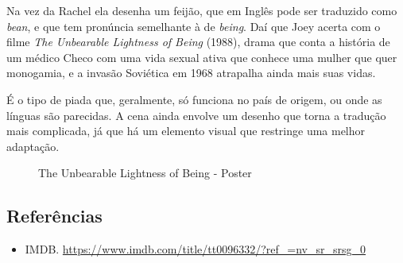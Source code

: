 Na vez da Rachel ela desenha um feijão, que em Inglês pode ser traduzido
como \emph{bean}, e que tem pronúncia semelhante à de \emph{being}. Daí
que Joey acerta com o filme \emph{The Unbearable Lightness of Being}
(1988), drama que conta a história de um médico Checo com uma vida
sexual ativa que conhece uma mulher que quer monogamia, e a invasão
Soviética em 1968 atrapalha ainda mais suas vidas.

É o tipo de piada que, geralmente, só funciona no país de origem, ou
onde as línguas são parecidas. A cena ainda envolve um desenho que torna
a tradução mais complicada, já que há um elemento visual que restringe
uma melhor adaptação.

\begin{figure}
  \centering
    \caption{The Unbearable Lightness of Being - Poster\label{fig:the-unbearable-lightness-of-being-poster}}
\end{figure}

\hypertarget{referuxeancias-16}{%
\subsection{Referências}\label{referuxeancias-16}}

\begin{itemize}
\tightlist
\item
  \sloppy IMDB. \url{https://www.imdb.com/title/tt0096332/?ref_=nv_sr_srsg_0}
\end{itemize}
